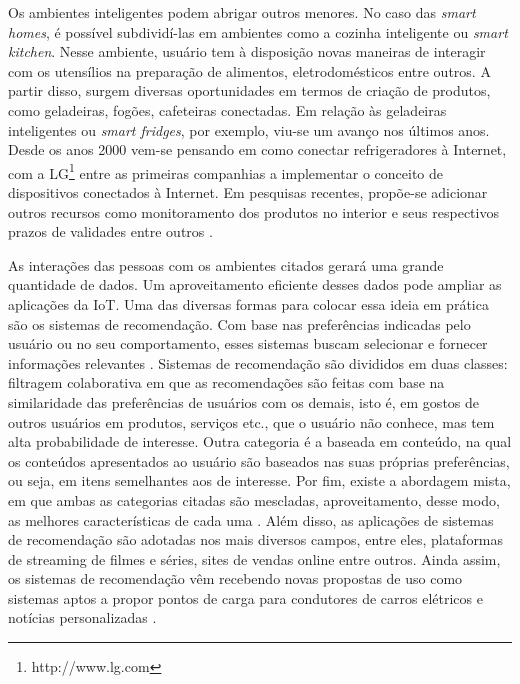 Os ambientes inteligentes podem abrigar outros menores. No caso das \textit{smart homes}, é possível subdividí-las em ambientes como a cozinha inteligente ou \textit{smart kitchen}. Nesse ambiente, usuário tem à disposição novas maneiras de interagir com os utensílios na preparação de alimentos, eletrodomésticos entre outros. A partir disso, surgem diversas oportunidades em termos de criação de produtos, como geladeiras, fogões, cafeteiras conectadas. Em relação às geladeiras inteligentes ou \textit{smart fridges}, por exemplo, viu-se um avanço nos últimos anos. Desde os anos 2000 vem-se pensando em como conectar refrigeradores à Internet, com a LG\textsuperscript{\textregistered}\footnote{http://www.lg.com} entre as primeiras companhias a implementar o conceito de dispositivos conectados à Internet. Em pesquisas recentes, propõe-se adicionar outros recursos como monitoramento dos produtos no interior e seus respectivos prazos de validades entre outros \cite{Hachani2016}. 

As interações das pessoas com os ambientes citados gerará uma grande quantidade de dados. Um aproveitamento eficiente desses dados pode ampliar as aplicações da IoT. Uma das diversas formas para colocar essa ideia em prática são os sistemas de recomendação. Com base nas preferências indicadas pelo usuário ou no seu comportamento, esses sistemas buscam selecionar e fornecer informações relevantes \cite{Filho2008}. Sistemas de recomendação são divididos em duas classes: filtragem colaborativa em que as recomendações são feitas com base na similaridade das preferências de usuários com os demais, isto é, em gostos de outros usuários em produtos, serviços etc., que o usuário não conhece, mas tem alta probabilidade de interesse. Outra categoria é a baseada em conteúdo, na qual os conteúdos apresentados ao usuário são baseados nas suas próprias preferências, ou seja, em itens semelhantes aos de interesse. Por fim, existe a abordagem mista, em que ambas as categorias citadas são mescladas, aproveitamento, desse modo, as melhores características de cada uma \cite{Thomas2016}.
Além disso, as aplicações de sistemas de recomendação são adotadas nos mais diversos campos, entre eles, plataformas de streaming de filmes e séries, sites de vendas online entre outros. Ainda assim, os sistemas de recomendação vêm recebendo novas propostas de uso como sistemas aptos a propor pontos de carga para condutores de carros elétricos \cite{Ferreira2011} e notícias personalizadas \cite{Yeung2010}. 


